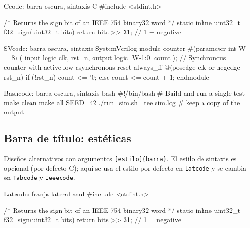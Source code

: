 \begin{codigo}
\begin{Ccode}{Ccode: barra oscura, sintaxis C}
#include <stdint.h>

/* Returns the sign bit of an IEEE 754 binary32 word */
static inline uint32_t f32_sign(uint32_t bits) {
    return bits >> 31;   // 1 = negative
}
\end{Ccode}
\caption{Ejemplo con \texttt{Ccode}.}
\label{lst:ej-ccode}
\end{codigo}

\begin{codigo}
\begin{SVcode}{SVcode: barra oscura, sintaxis SystemVerilog}
module counter #(parameter int W = 8) (
  input  logic         clk, rst_n,
  output logic [W-1:0] count
);
  // Synchronous counter with active-low asynchronous reset
  always_ff @(posedge clk or negedge rst_n)
    if (!rst_n) count <= '0;
    else        count <= count + 1;
endmodule
\end{SVcode}
\caption{Ejemplo con \texttt{SVcode}.}
\label{lst:ej-svcode}
\end{codigo}

\begin{codigo}
\begin{Bashcode}{Bashcode: barra oscura, sintaxis bash}
#!/bin/bash
# Build and run a single test
make clean
make all SEED=42
./run_sim.sh | tee sim.log   # keep a copy of the output
\end{Bashcode}
\caption{Ejemplo con \texttt{Bashcode}.}
\label{lst:ej-bashcode}
\end{codigo}

\subsection{Barra de título: estéticas}
\label{subsec:ej-code-esteticas}

Diseños alternativos con argumentos \texttt{[estilo]\{barra\}}. El estilo de sintaxis es opcional (por defecto C); aquí se usa el estilo por defecto en \texttt{Latcode} y se cambia en \texttt{Tabcode} y \texttt{Ieeecode}.

\begin{codigo}
\begin{Latcode}{Latcode: franja lateral azul}
#include <stdint.h>

/* Returns the sign bit of an IEEE 754 binary32 word */
static inline uint32_t f32_sign(uint32_t bits) {
    return bits >> 31;   // 1 = negative
}
\end{Latcode}
\caption{Ejemplo con \texttt{Latcode} (estilo por defecto \texttt{caja\_c}).}
\label{lst:ej-latcode}
\end{codigo}

